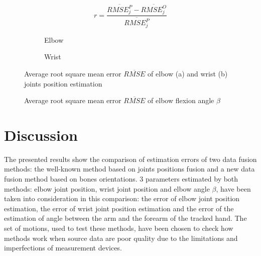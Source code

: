 \documentclass[sensors,article,submit,moreauthors,pdftex,10pt,a4paper]{mdpi}
\begin{document}
	\begin{equation}
		r = \frac{\overline{RMSE^P_j} - \overline{RMSE^O_j}}{\overline{RMSE^P_j}}
		\label{eq:results:comparison}
	\end{equation}
	
	\begin{figure}[H]
		\centering
		\begin{subfigure}[b]{0.49\textwidth}
			\centering
			
			\caption{Elbow}
			\label{fig:results:positionError:a}
		\end{subfigure} \hfill
		\begin{subfigure}[b]{0.49\textwidth}
			\centering
			
			\caption{Wrist}
			\label{fig:results:positionError:b}
		\end{subfigure}
		\caption{Average root square mean error $\overline{RMSE}$ of elbow (a) and wrist (b) joints position estimation}
		\label{fig:results:positionError}
	\end{figure}   
	
	\begin{figure}[H]
		\centering
		
		\caption{Average root square mean error $\overline{RMSE}$ of elbow flexion angle $\beta$}
		\label{fig:results:elbowAngleError}
	\end{figure}
	
	\section{Discussion}
	
	The presented results show the comparison of estimation errors of two data fusion methods: the well-known method based on joints positions fusion and a new data fusion method based on bones orientations. 3 parameters estimated by both methods: elbow joint position, wrist joint position and elbow angle $\beta$, have been taken into consideration in this comparison: the error of elbow joint position estimation, the error of wrist joint position estimation and the error of the estimation of angle between the arm and the forearm of the tracked hand. The set of motions, used to test these methods, have been chosen to check how methods work when source data are poor quality due to the limitations and imperfections of measurement devices.
	
\end{document}
